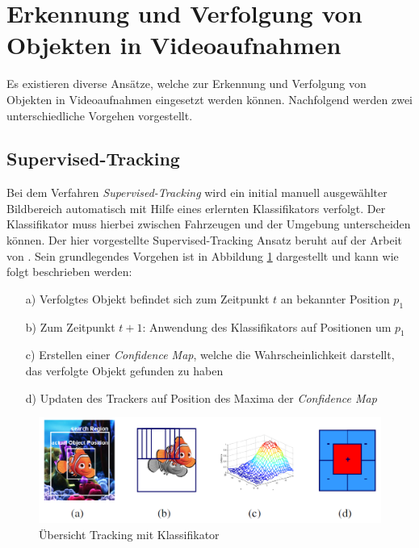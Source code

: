 \section{Erkennung und Verfolgung von Objekten in Videoaufnahmen}

Es existieren diverse Ansätze, welche zur Erkennung und Verfolgung von Objekten in Videoaufnahmen eingesetzt werden können.
Nachfolgend werden zwei unterschiedliche Vorgehen vorgestellt.

\subsection{Supervised-Tracking}

Bei dem Verfahren \textit{Supervised-Tracking} wird ein initial manuell ausgewählter Bildbereich
automatisch mit Hilfe eines erlernten Klassifikators verfolgt. Der Klassifikator muss hierbei zwischen
Fahrzeugen und der Umgebung unterscheiden können.
Der hier vorgestellte Supervised-Tracking Ansatz beruht auf der Arbeit von \cite{Grabner}.
Sein grundlegendes Vorgehen ist in Abbildung \ref{fig:grund_tracking} dargestellt und kann wie folgt
beschrieben werden:

\begin{itemize}
    \item[a)] Verfolgtes Objekt befindet sich zum Zeitpunkt $t$ an bekannter Position $p_1$
    \item[b)] Zum Zeitpunkt $t+1$: Anwendung des Klassifikators auf Positionen um $p_1$
    \item[c)] Erstellen einer \textit{Confidence Map}, welche die Wahrscheinlichkeit darstellt,
                das verfolgte Objekt gefunden zu haben
    \item[d)] Updaten des Trackers auf Position des Maxima der \textit{Confidence Map}
\end{itemize}

\begin{figure}[H]
    \centering
    \includegraphics[width=0.7\linewidth]{resources/img/grundlagen/TrajectoryReconstruction/tracking}
    \caption[Übersicht Tracking mit Klassifikator]{Übersicht Tracking mit Klassifikator \cite[]{Grabner}}
    \label{fig:grund_tracking}
\end{figure}

